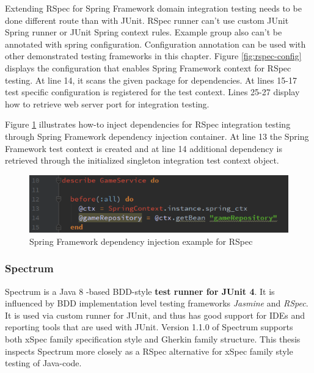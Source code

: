     Extending RSpec for Spring Framework domain integration testing needs to be done different route than with JUnit. RSpec
    runner can't use custom JUnit Spring runner or JUnit Spring context rules. Example group also can't be annotated with
    spring configuration. Configuration annotation can be used with other demonstrated testing frameworks in this chapter. Figure \ref{fig:rspec-config}
    displays the configuration that enables Spring Framework context for RSpec testing. At line 14, it scans the given
    package for dependencies. At lines 15-17 test specific configuration is registered for the test context. Lines 25-27
    display how to retrieve web server port for integration testing.

    Figure \ref{fig:rspec-autowire}
    illustrates how-to inject dependencies for RSpec integration testing through Spring Framework dependency injection container.
    At line 13 the Spring Framework test context is created and at line 14 additional dependency is retrieved
    through the initialized singleton integration test context object.

    \begin{figure}[ht]
      \begin{center}
        \includegraphics[width=12.0cm]{images/rspec-autowire.png}
        \caption{Spring Framework dependency injection example for RSpec}
        \label{fig:rspec-autowire}
      \end{center}
    \end{figure}

    \subsubsection{Spectrum}
    Spectrum is a Java 8 -based BDD-style \textbf{test runner for JUnit 4}. It is influenced by BDD implementation
    level testing frameworks \textit{Jasmine} and \textit{RSpec}. It is used via custom runner for JUnit, and thus has good support for
    IDEs and reporting tools that are used with JUnit. Version 1.1.0 of Spectrum supports both xSpec family specification style and Gherkin
    family structure. This thesis inspects Spectrum more closely as a RSpec alternative for xSpec family style testing of Java-code.~\cite{spectrum}

